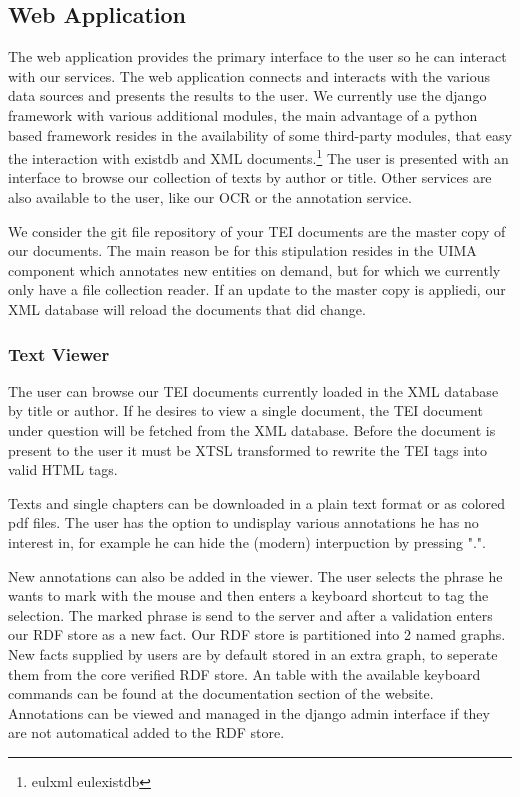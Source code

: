 \documentclass[12pt, draft]{article}
\begin{document}
\subsection{Web Application}

The web application provides the primary interface to the user so he can  interact with our services.
The web application connects and interacts with the various data sources and presents
the results to the user.
We currently use the django framework with various additional modules,
the main advantage of a python based framework resides in the availability
of some third-party modules, that easy the interaction with existdb and XML
documents.\footnote{eulxml eulexistdb}
The user is presented with an interface to browse our collection of texts by
author or title.  Other services are also available to the user, like our
OCR or the annotation service.

We consider the git file repository of your TEI documents are the master copy
of our documents.  The main reason be for this stipulation resides in the
UIMA component which annotates new entities on demand, but for which we
currently only have a file collection reader.  If an update to the master copy
is appliedi, our XML database will reload the documents that did change.

\subsubsection{Text Viewer}

The user can browse our TEI documents currently loaded in the XML database by title
or author.  If he desires to view a single document, the TEI document under question
will be fetched from the XML database.  Before the document is present to the
user it must be XTSL transformed to rewrite the TEI tags into valid HTML
tags.

Texts and single chapters can be downloaded in a plain text format or as colored pdf files.
The user has the option to undisplay various annotations he has no interest in, for example
he can hide the (modern) interpuction by pressing ".".

New annotations can also be added in the viewer. The user selects the phrase he wants
to mark with the mouse and then enters a keyboard shortcut to tag the selection.
The marked phrase is send to the server and after a validation enters
our RDF store as a new fact.  Our RDF store is partitioned into 2 named graphs.
New facts supplied by users are by default stored in an extra graph, to seperate them
from the core verified RDF store.  An table with the available keyboard commands
can be found at the documentation section of the website.
Annotations can be viewed and managed in the django admin interface if they are not
automatical added to the RDF store.
\end{document}
